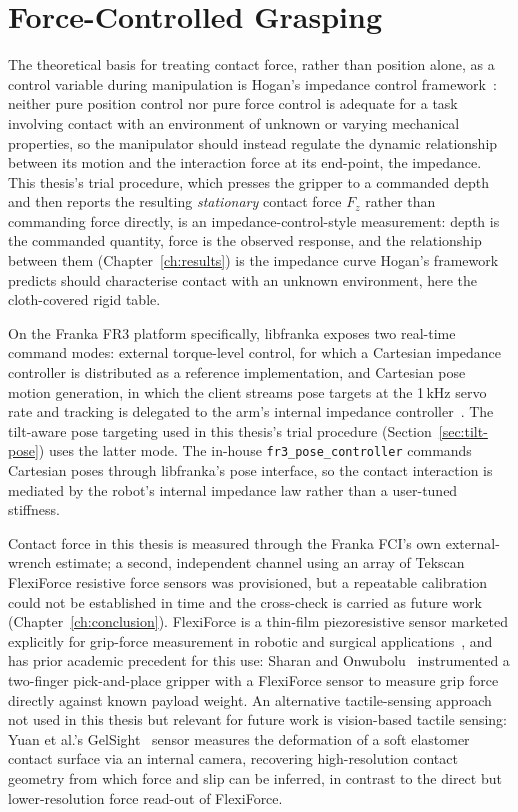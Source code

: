 \section{Force-Controlled Grasping}

The theoretical basis for treating contact force, rather than position
alone, as a control variable during manipulation is Hogan's impedance
control framework~\cite{hogan1985impedancePartI,hogan1985impedancePartII,hogan1985impedancePartIII}:
neither pure position control nor pure force control is adequate for a
task involving contact with an environment of unknown or varying
mechanical properties, so the manipulator should instead regulate the
dynamic relationship between its motion and the interaction force at
its end-point, the impedance. This thesis's trial procedure, which
presses the gripper to a commanded depth and then reports the resulting
\emph{stationary} contact force $F_z$ rather than commanding force
directly, is an impedance-control-style measurement: depth is the
commanded quantity, force is the observed response, and the relationship
between them (Chapter~\ref{ch:results}) is the impedance curve
Hogan's framework predicts should characterise contact with an unknown
environment, here the cloth-covered rigid table.

On the Franka FR3 platform specifically, libfranka exposes two
real-time command modes: external torque-level control, for which a
Cartesian impedance controller is distributed as a reference
implementation, and Cartesian pose motion generation, in which the
client streams pose targets at the 1\,kHz servo rate and tracking is
delegated to the arm's internal impedance
controller~\cite{frankarobotics_libfranka}. The tilt-aware pose
targeting used in this thesis's trial procedure
(Section~\ref{sec:tilt-pose}) uses the latter mode. The in-house
\texttt{fr3\_pose\_controller} commands Cartesian poses through
libfranka's pose interface, so the contact interaction is mediated by
the robot's internal impedance law rather than a user-tuned stiffness.

Contact force in this thesis is measured through the Franka FCI's own
external-wrench estimate; a second, independent channel using an array
of Tekscan FlexiForce resistive force sensors was provisioned, but a
repeatable calibration could not be established in time and the
cross-check is carried as future work (Chapter~\ref{ch:conclusion}). FlexiForce is a thin-film piezoresistive sensor
marketed explicitly for grip-force measurement in robotic and surgical
applications~\cite{tekscan_flexiforce_gripforce}, and has prior academic
precedent for this use: Sharan and
Onwubolu~\cite{sharan2015flexiforce} instrumented a two-finger
pick-and-place gripper with a FlexiForce sensor to measure grip force
directly against known payload weight. An alternative tactile-sensing
approach not used in this thesis but relevant for future work is
vision-based tactile sensing: Yuan et al.'s
GelSight~\cite{yuan2017gelsight} sensor measures the deformation of a soft
elastomer contact surface via an internal camera, recovering high-resolution
contact geometry from which force and slip can be inferred, in contrast to
the direct but lower-resolution force read-out of FlexiForce.

